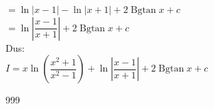 \documentclass[a4paper]{article}
\begin{document}
$ = \ln|x-1|-\ln|x+1|+2\operatorname{Bgtan}x + c$\\

$ = \ln\left|\dfrac{x-1}{x+1}\right|+2\operatorname{Bgtan}x+c$\\

Dus:\\

$ I =x\ln\left(\dfrac{x^2+1}{x^2-1}\right)+\ln\left|\dfrac{x-1}{x+1}\right|+2\operatorname{Bgtan}x+c$\\

\begin{thebibliography}{999}
\end{thebibliography}
\end{document}
